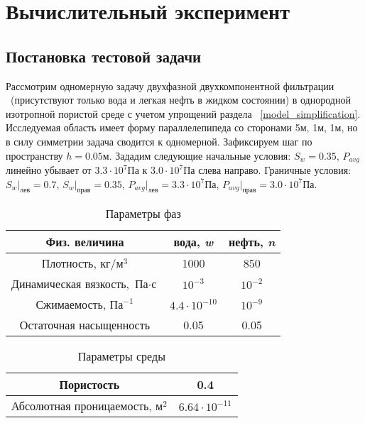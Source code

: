 \section{Вычислительный эксперимент}

\subsection{Постановка тестовой задачи}
\label{test_task}
Рассмотрим одномерную задачу двухфазной двухкомпонентной фильтрации ~(присутствуют только вода и легкая нефть в жидком состоянии)
в однородной изотропной пористой среде с учетом упрощений раздела ~\ref{model_simplification}.
Исследуемая область имеет форму параллелепипеда со сторонами 5м, 1м, 1м, но в силу симметрии задача сводится к одномерной.
Зафиксируем шаг по пространству $h=0.05\text{м}$.
Зададим следующие начальные условия: $S_w = 0.35$, $P_{avg}$ линейно убывает от $3.3\cdot 10^7$Па к $3.0\cdot 10^7$Па слева направо.
Граничные условия: $S_w|_{\text{лев}} = 0.7$, $S_w|_{\text{прав}} = 0.35$,
$P_{avg}|_{\text{лев}} = 3.3\cdot 10^7$Па, $P_{avg}|_{\text{прав}} = 3.0\cdot 10^7$Па.

\begin{table}[H]
\caption{Параметры фаз}
\label{tabular:liquids}
\begin{center}
\begin{tabular}{|c|c|c|}
\hline
Физ. величина & вода, \textit {w} & нефть, \textit {n} \\
\hline
Плотность,  $ {\text{кг}} / {\text{м}^3} $ & 1000 & 850 \\
\hline
Динамическая вязкость, $ \text{Па} \cdot \text{с} $ & $10^{-3}$ & $10^{-2}$ \\
\hline
Сжимаемость, $ \text{Па}^{-1}$ & $4.4 \cdot 10^{-10}$ & $10^{-9}$ \\
\hline
Остаточная насыщенность & 0.05 & 0.05 \\
\hline
\end{tabular}
\end{center}
\end{table}

\begin{table}[H]
\caption{Параметры среды}
\label{tabular:medium}
\begin{center}
\begin{tabular}{|c|c|}
\hline
Пористость & 0.4\\
\hline
Абсолютная проницаемость, $ \text{м}^{2}$ & $6.64 \cdot 10^{-11}$ \\
\hline
\end{tabular}
\end{center}
\end{table}


